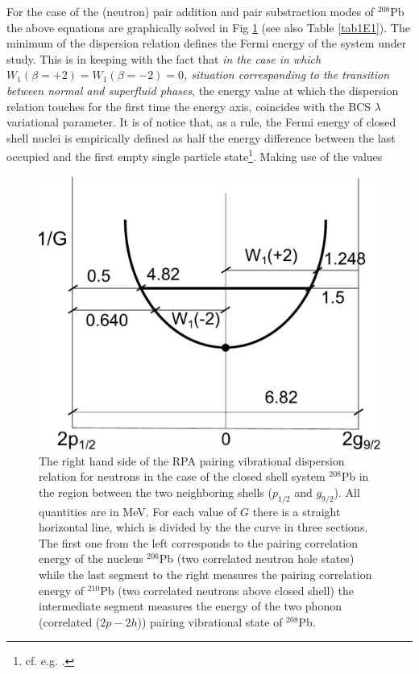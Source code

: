 For the case of the (neutron) pair addition and pair substraction modes of $^{208}$Pb the above equations are  graphically solved in Fig \ref{fig1E1} (see also Table \ref{tab1E1}). The minimum of the dispersion relation defines the Fermi energy of the system under study. This is in keeping with the fact that \textit{in the case in which $W_1 (\beta=+2)=W_1(\beta=-2)=0$, situation corresponding to the  transition between normal and superfluid phases}, the energy value at which the dispersion relation touches for the first time the energy axis, coincides with the BCS $\lambda$ variational parameter. It is of notice that, as a rule, the Fermi energy of closed shell nuclei is empirically defined as half the energy difference between the last occupied and the first empty single particle state\footnote{cf. e.g. \cite{Mahaux:85}.}. Making use of the values 
  \begin{figure}
  \centerline{\includegraphics*[width=\textwidth,angle=0]{nutshell/figs/dispersion.pdf}}
  \caption{The right hand side of the RPA pairing vibrational dispersion relation for neutrons in the case of the closed shell system $^{208}$Pb in the region between the two neighboring shells ($p_{1/2}$ and $g_{9/2}$). All quantities are in MeV. For each value of $G$ there is a straight horizontal line, which is divided by the the curve in three sections. The first one from the left corresponds to the pairing correlation energy of the nucleus $^{206}$Pb (two correlated neutron hole states) while the last segment to the right measures the pairing correlation energy of $^{210}$Pb (two correlated neutrons above closed shell) the intermediate segment measures the energy of the two phonon (correlated ($2p-2h$)) pairing vibrational state  of $^{208}$Pb.}\label{fig1E1}
  \end{figure}
